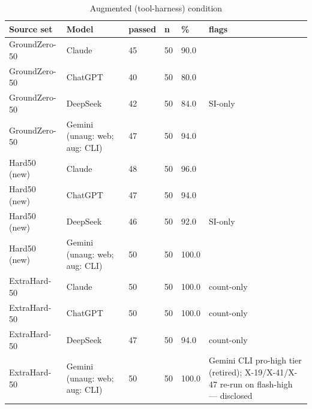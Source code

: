 \begin{table}[t]\centering\small\caption{Augmented (tool-harness) condition}\label{tab:aug}
\begin{tabular}{llllll}
\toprule
Source set & Model & passed & n & \% & flags \\
\midrule
GroundZero-50 & Claude & 45 & 50 & 90.0 &  \\
GroundZero-50 & ChatGPT & 40 & 50 & 80.0 &  \\
GroundZero-50 & DeepSeek & 42 & 50 & 84.0 & SI-only \\
GroundZero-50 & Gemini (unaug: web; aug: CLI) & 47 & 50 & 94.0 &  \\
Hard50 (new) & Claude & 48 & 50 & 96.0 &  \\
Hard50 (new) & ChatGPT & 47 & 50 & 94.0 &  \\
Hard50 (new) & DeepSeek & 46 & 50 & 92.0 & SI-only \\
Hard50 (new) & Gemini (unaug: web; aug: CLI) & 50 & 50 & 100.0 &  \\
ExtraHard-50 & Claude & 50 & 50 & 100.0 & count-only \\
ExtraHard-50 & ChatGPT & 50 & 50 & 100.0 & count-only \\
ExtraHard-50 & DeepSeek & 47 & 50 & 94.0 & count-only \\
ExtraHard-50 & Gemini (unaug: web; aug: CLI) & 50 & 50 & 100.0 & Gemini CLI pro-high tier (retired); X-19/X-41/X-47 re-run on flash-high — disclosed \\
\bottomrule
\end{tabular}
\end{table}


